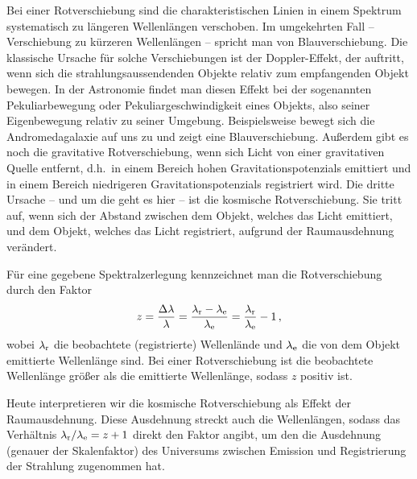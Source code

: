 Bei einer Rotverschiebung 
sind die charakteristischen Linien in einem Spektrum
systematisch zu l\"angeren Wellenl\"angen verschoben. Im umgekehrten Fall -- Verschiebung zu
k\"urzeren Wellenl\"angen -- spricht man von Blauverschiebung. Die klassische Ursache f\"ur solche
Verschiebungen ist der Doppler-Effekt, der auftritt, wenn sich die strahlungsaussendenden Objekte
relativ zum empfangenden Objekt bewegen. In der Astronomie findet man diesen Effekt bei der
sogenannten Pekuliarbewegung 
oder Pekuliargeschwindigkeit eines Objekts, also seiner Eigenbewegung
relativ zu seiner Umgebung. Beispielsweise bewegt sich die Andromedagalaxie auf uns zu und zeigt
eine Blauverschiebung. Au\ss erdem gibt es noch
die gravitative Rotverschiebung, wenn sich Licht von einer gravitativen Quelle entfernt, d.h.\ in einem
Bereich hohen Gravitationspotenzials emittiert und in einem Bereich niedrigeren Gravitationspotenzials 
registriert wird. Die dritte Ursache -- und um die geht es hier -- ist die kosmische Rotverschiebung. Sie 
tritt auf, wenn sich der Abstand zwischen dem Objekt, welches das Licht emittiert, und dem Objekt, welches
das Licht registriert, aufgrund der Raumausdehnung ver\"andert.  

F\"ur eine gegebene Spektralzerlegung kennzeichnet 
man die Rotverschiebung durch den Faktor
\begin{equation}
                z = \frac{\Delta \lambda}{\lambda} = \frac{\lambda_{\rm r} - \lambda_{\rm e}}{\lambda_{\rm e}}
                   = \frac{\lambda_{\rm r}}{\lambda_{\rm e}} - 1 \, ,
\end{equation}
wobei $\lambda_{\rm r}$ die beobachtete (registrierte) Wellenl\"ande und $\lambda_{\rm e}$ die von dem Objekt 
emittierte Wellenl\"ange sind. Bei einer Rotverschiebung ist die beobachtete Wellenl\"ange gr\"o\ss er
als die emittierte Wellenl\"ange, sodass $z$ positiv ist. 

Heute interpretieren wir die kosmische Rotverschiebung als Effekt der Raumausdehnung. Diese Ausdehnung
streckt auch die Wellenl\"angen, sodass das Verh\"altnis $\lambda_{\rm r}/\lambda_{\rm e}= z+1$ 
direkt den Faktor angibt, um den die Ausdehnung (genauer der Skalenfaktor) des Universums zwischen
Emission und Registrierung der Strahlung zugenommen hat.

